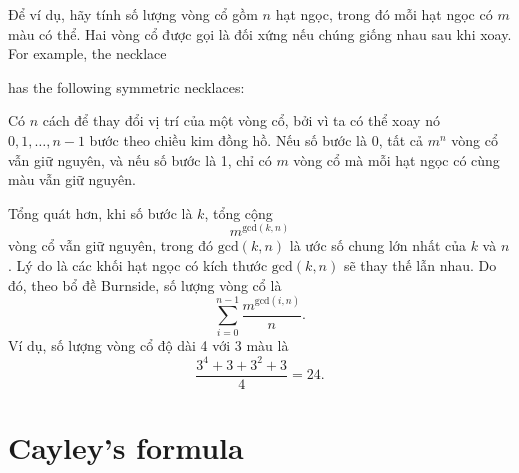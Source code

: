 Để ví dụ, hãy tính số lượng
vòng cổ gồm $n$ hạt ngọc,
trong đó mỗi hạt ngọc có $m$ màu có thể.
Hai vòng cổ được gọi là đối xứng nếu chúng
giống nhau sau khi xoay.
For example, the necklace
\begin{center}
\end{center}
has the following symmetric necklaces:
\begin{center}
\end{center}
Có $n$ cách để thay đổi vị trí
của một vòng cổ,
bởi vì ta có thể xoay nó
$0,1,\ldots,n-1$ bước theo chiều kim đồng hồ.
Nếu số bước là 0,
tất cả $m^n$ vòng cổ vẫn giữ nguyên,
và nếu số bước là 1,
chỉ có $m$ vòng cổ mà mỗi
hạt ngọc có cùng màu vẫn giữ nguyên.

Tổng quát hơn, khi số bước là $k$,
tổng cộng
\[m^{\textrm{gcd}(k,n)}\]
vòng cổ vẫn giữ nguyên,
trong đó $\textrm{gcd}(k,n)$ là ước số chung
lớn nhất của $k$ và $n$.
Lý do là các khối
hạt ngọc có kích thước $\textrm{gcd}(k,n)$
sẽ thay thế lẫn nhau.
Do đó, theo bổ đề Burnside,
số lượng vòng cổ là
\[\sum_{i=0}^{n-1} \frac{m^{\textrm{gcd}(i,n)}}{n}. \]
Ví dụ, số lượng vòng cổ độ dài 4
với 3 màu là
\[\frac{3^4+3+3^2+3}{4} = 24. \]

\section{Cayley's formula}

